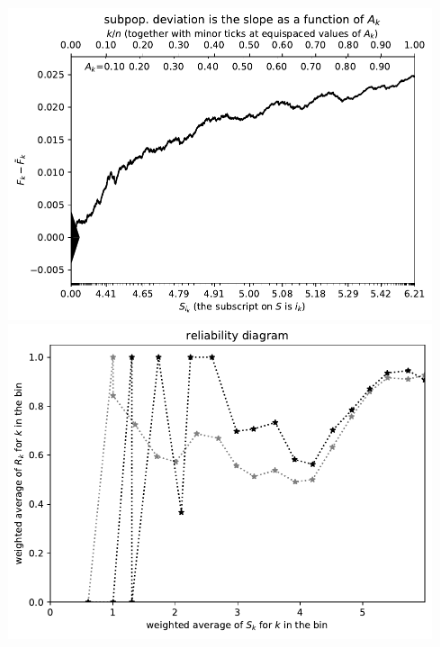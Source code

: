 \documentclass{article}
\begin{document}
\begin{figure}
\begin{centering}

\parbox{\imsize}{\includegraphics[width=\imsize]
{./codes/weighted/County_of_Orange-HISPEED/cumulative}}
\quad\quad
\parbox{\imsize}{\includegraphics[width=\imsize]
{./codes/weighted/County_of_Orange-HISPEED/equiscores20}}

\vspace{\vertsep}


\end{centering}
\end{figure}
\end{document}
